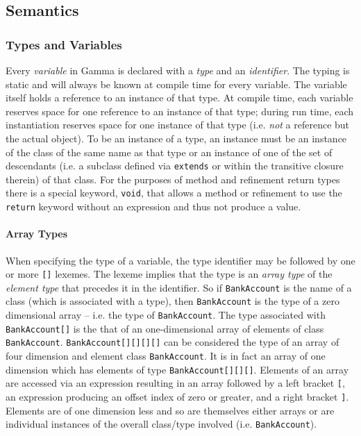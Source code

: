 \subsection{Semantics}

\subsubsection{Types and Variables}
Every \textit{variable} in Gamma is declared with a \textit{type} and an \textit{identifier}. The typing is static and will always be known at compile time for every variable. The variable itself holds a reference to an instance of that type. At compile time, each variable reserves space for one reference to an instance of that type; during run time, each instantiation reserves space for one instance of that type (i.e. \emph{not} a reference but the actual object). To be an instance of a type, an instance must be an instance of the class of the same name as that type or an instance of one of the set of descendants (i.e. a subclass defined via \verb!extends! or within the transitive closure therein) of that class. For the purposes of method and refinement return types there is a special keyword, \verb!void!, that allows a method or refinement to use the \verb!return! keyword without an expression and thus not produce a value.

\paragraph{Array Types}
When specifying the type of a variable, the type identifier may be followed by one or more \verb![]! lexemes. The lexeme implies that the type is an \textit{array type} of the \textit{element type} that precedes it in the identifier. So if \verb!BankAccount! is the name of a class (which is associated with a type), then \verb!BankAccount! is the type of a zero dimensional array -- i.e. the type of \verb!BankAccount!. The type associated with \verb!BankAccount[]! is the that of an one-dimensional array of elements of class \verb!BankAccount!. \verb!BankAccount[][][][]! can be considered the type of an array of four dimension and element class \verb!BankAccount!. It is in fact an array of one dimension which has elements of type \verb!BankAccount[][][]!. Elements of an array are accessed via an expression resulting in an array followed by a left bracket \verb![!, an expression producing an offset index of zero or greater, and a right bracket \verb!]!. Elements are of one dimension less and so are themselves either arrays or are individual instances of the overall class/type involved (i.e. \verb!BankAccount!).


